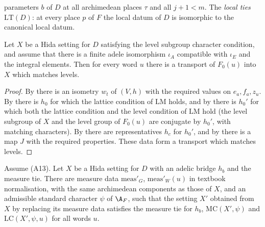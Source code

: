 \begin{definition}
\begin{enumerate}[label=(\alph*)]
  parameters $b$ of $D$ at all archimedean places $\tau$ and all $j+1<m$. The \emph{local ties} $\mathrm{LT}(D)$: at every
  place $p$ of $F$ the local datum of $D$ is isomorphic to the canonical local datum.
\end{enumerate}
%
%
%
\end{definition}

\begin{lemma}[Transports]\label{pf:baselat1:transport}
Let $X$ be a Hida setting for $D$ satisfying the level subgroup character condition, and assume that there is a finite
adele isomorphism $\iota_A$ compatible with $\iota_E$ and the integral elements. Then for every word $u$ there is a
transport of $F_0(u)$ into $X$ which matches levels.
\end{lemma}

\begin{proof}
By  there is an isometry $w_t$ of $(V,h)$ with the required values on
$e_a,f_a,z_u$. By
 there is $h_0$ for which the lattice condition of $\mathrm{LM}$ holds,
and by  there is $h_0'$ for which both the lattice condition and the
level condition of $\mathrm{LM}$ hold (the level subgroup of $X$ and the level group of $F_0(u)$ are conjugate by
$h_0'$, with matching characters). By  there are representatives $h_c$ for
$h_0'$, and by  there is a map $J$ with the required properties. These data
form a transport which matches levels.
\end{proof}

\begin{lemma}\label{pf:baselat1:rescale}
Assume (A13). Let $X$ be a Hida setting for $D$ with an adelic bridge $h_b$ and the measure tie. There are measure
data $\mathrm{meas}'_G$, $\mathrm{meas}'_W(u)$ in textbook normalisation, with the same archimedean components as those
of $X$, and an admissible standard character $\psi$ of $\A_F$, such that the setting $X'$ obtained from $X$ by
replacing its measure data satisfies the measure tie for $h_b$, $\mathrm{MC}(X',\psi)$ and $\mathrm{LC}(X',\psi,u)$
for all words $u$.
\end{lemma}

